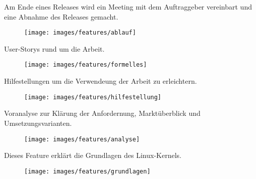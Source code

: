 \begin{description}[leftmargin=5cm]

   \item[Ablauf]
   Am Ende eines Releases wird ein Meeting mit dem Auftraggeber vereinbart und eine Abnahme des Releases gemacht.
   \begin{figure}[h!]
      \begin{center}
         \texttt{[image: images/features/ablauf]}
      \end{center}
   \end{figure}

   \clearpage
   \item[Formelles]
   User-Storys rund um die Arbeit.
   \begin{figure}[h!]
      \begin{center}
         \texttt{[image: images/features/formelles]}
      \end{center}
   \end{figure}

   \item[Hilfestellung]
   Hilfestellungen um die Verwendeung der Arbeit zu erleichtern.
   \begin{figure}[h!]
      \begin{center}
         \texttt{[image: images/features/hilfestellung]}
      \end{center}
   \end{figure}


\newpage
   \item[Analyse]
   Voranalyse zur Klärung der Anfordernung, Marktüberblick und Umsetzungsvarianten.
   \begin{figure}[h!]
      \begin{center}
         \texttt{[image: images/features/analyse]}
      \end{center}
   \end{figure}


   \item[Grundlagen]
   Dieses Feature erklärt die Grundlagen des Linux-Kernels.
   \begin{figure}[h!]
      \begin{center}
         \texttt{[image: images/features/grundlagen]}
      \end{center}
   \end{figure}


\end{description}
